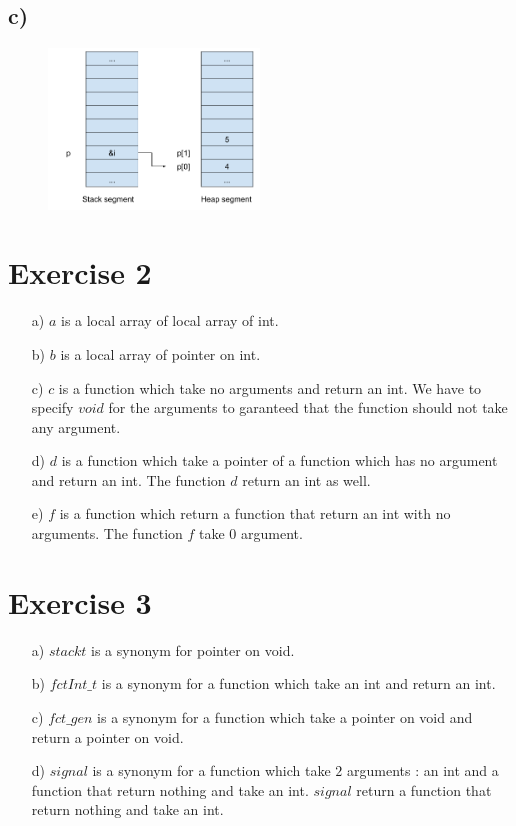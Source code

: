 \documentclass[a4paper,11pt]{report}
\begin{document}
\FloatBarrier

\subsection*{c)}

\begin{figure}[h]
  \centering
  \includegraphics[width=0.5\textwidth]{figures/SOP_s06_ex1_c}
  \caption{\label{fig:ex1-c}}
\end{figure}

\FloatBarrier

\section*{Exercise 2}

\begin{itemize}
\item[a)] $a$ is a local array of local array of int.
\item[b)] $b$ is a local array of pointer on int.
\item[c)] $c$ is a function which take no arguments and return an int. We have
  to specify $void$ for the arguments to garanteed that the function should not
  take any argument.
\item[d)] $d$ is a function which take a pointer of a function which has no
  argument and return an int. The function $d$ return an int as well.
\item[e)] $f$ is a function which return a function that return an int with no
  arguments. The function $f$ take $0$ argument.
\end{itemize}

\section*{Exercise 3}

\begin{itemize}
\item[a)] $stackt$ is a synonym for pointer on void.
\item[b)] $fctInt\_t$ is a synonym for a function which take an int and return
  an int.
\item[c)] $fct\_gen$ is a synonym for a function which take a pointer on void
  and return a pointer on void.
\item[d)] $signal$ is a synonym for a function which take $2$ arguments : an int
  and a function that return nothing and take an int. $signal$ return a function
  that return nothing and take an int.
\end{itemize}
\end{document}
